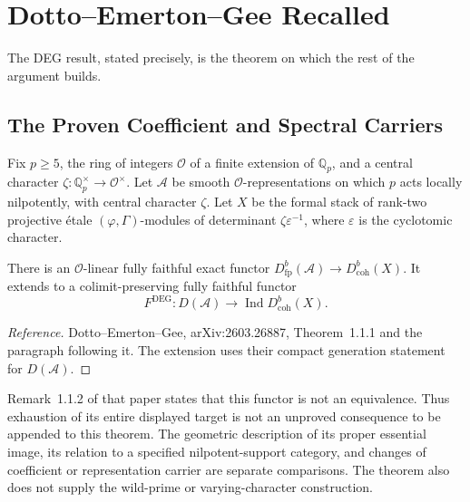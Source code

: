 \section{Dotto--Emerton--Gee Recalled}
\label{v4-arith:deg-f1a:deg-recalled}

The DEG result, stated precisely, is the theorem on which
the rest of the argument builds.

\subsection{The Proven Coefficient and Spectral Carriers}
Fix \(p\ge5\), the ring of integers \(\mathcal O\) of a finite
extension of \(\mathbb Q_p\), and a central character
\(\zeta:\mathbb Q_p^\times\to\mathcal O^\times\).
Let \(\mathcal A\) be smooth \(\mathcal O\)-representations on
which \(p\) acts locally nilpotently, with central character \(\zeta\).
Let \(X\) be the formal stack of rank-two projective étale
\((\varphi,\Gamma)\)-modules of determinant \(\zeta\varepsilon^{-1}\),
where \(\varepsilon\) is the cyclotomic character.

\begin{theorem}
\label{v4-arith:deg-f1a:thm:deg-fixed-chi}
There is an \(\mathcal O\)-linear fully faithful exact functor
\(D^b_{\mathrm{fp}}(\mathcal A)\to D^b_{\mathrm{coh}}(X)\).
It extends to a colimit-preserving fully faithful functor
\begin{equation}
\label{v4-arith:deg-f1a:eq:deg-functor}
 F^{\mathrm{DEG}}:D(\mathcal A)\longrightarrow
 \operatorname{Ind}D^b_{\mathrm{coh}}(X).
\end{equation}
\end{theorem}
\begin{proof}[Reference]
Dotto--Emerton--Gee, arXiv:2603.26887, Theorem~1.1.1
and the paragraph following it. The extension uses their compact
generation statement for \(D(\mathcal A)\).
\end{proof}

\begin{remark}
\label{v4-arith:deg-f1a:rem:deg-not-assert}
Remark~1.1.2 of that paper states that this functor is not an
equivalence. Thus exhaustion of its entire displayed target is not
an unproved consequence to be appended to this theorem. The
geometric description of its proper essential image, its relation
to a specified nilpotent-support category, and changes of coefficient
or representation carrier are separate comparisons. The theorem
also does not supply the wild-prime or varying-character construction.
\end{remark}

